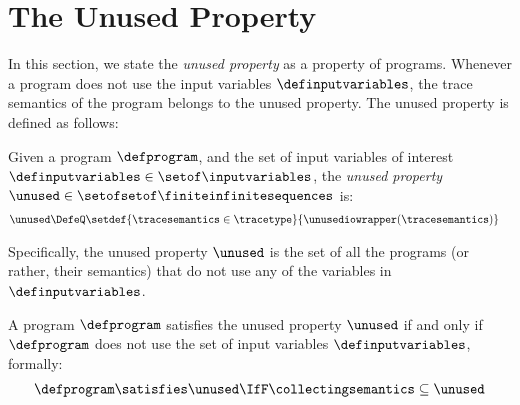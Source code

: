 \section{The Unused Property}

In this section, we state the \emph{unused property} as a property of programs.
Whenever a program does not use the input variables $\definputvariables$, the trace semantics of the program belongs to the unused property. The unused property is defined as follows:
\begin{definition}
  Given a program $\defprogram$, and the set of input variables of interest $\definputvariables\in\setof\inputvariables$, the \emph{unused property} $\unused\in\setofsetof\finiteinfinitesequences$ is:
  \begin{align*}
    \unused\DefeQ&
    \setdef{\tracesemantics\in\tracetype}{\unusediowrapper(\tracesemantics)}
  \end{align*}
\end{definition}


Specifically, the unused property $\unused$ is the set of all the programs (or rather, their semantics) that do not use any of the variables in $\definputvariables$.
%
%
\begin{remark}
  A program $\defprogram$ satisfies the unused property $\unused$ if and only if $\defprogram$ does not use the set of input variables $\definputvariables$, formally:
  \begin{align*}
    \defprogram \satisfies \unused \IfF \collectingsemantics \subseteq \unused
  \end{align*}
\end{remark}




